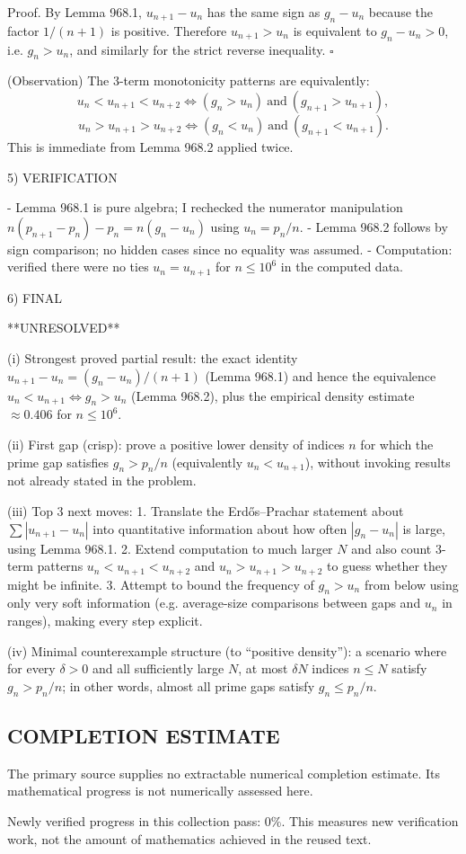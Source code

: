 Proof.
By Lemma 968.1, $u_{n+1}-u_n$ has the same sign as $g_n-u_n$ because the factor $1/(n+1)$ is positive. Therefore $u_{n+1}>u_n$ is equivalent to $g_n-u_n>0$, i.e. $g_n>u_n$, and similarly for the strict reverse inequality. $\square$

(Observation) The 3-term monotonicity patterns are equivalently:
\[
 u_n<u_{n+1}<u_{n+2}\iff (g_n>u_n)\ \text{and}\ (g_{n+1}>u_{n+1}),
\]
\[
 u_n>u_{n+1}>u_{n+2}\iff (g_n<u_n)\ \text{and}\ (g_{n+1}<u_{n+1}).
\]
This is immediate from Lemma 968.2 applied twice.

5) VERIFICATION

- Lemma 968.1 is pure algebra; I rechecked the numerator manipulation $n(p_{n+1}-p_n)-p_n = n(g_n-u_n)$ using $u_n=p_n/n$.
- Lemma 968.2 follows by sign comparison; no hidden cases since no equality was assumed.
- Computation: verified there were no ties $u_n=u_{n+1}$ for $n\le 10^6$ in the computed data.

6) FINAL

**UNRESOLVED**

(i) Strongest proved partial result: the exact identity $u_{n+1}-u_n=(g_n-u_n)/(n+1)$ (Lemma 968.1) and hence the equivalence $u_n<u_{n+1}\iff g_n>u_n$ (Lemma 968.2), plus the empirical density estimate $\approx 0.406$ for $n\le 10^6$.

(ii) First gap (crisp): prove a positive lower density of indices $n$ for which the prime gap satisfies $g_n>p_n/n$ (equivalently $u_n<u_{n+1}$), without invoking results not already stated in the problem.

(iii) Top 3 next moves:
1. Translate the Erd\H{o}s--Prachar statement about $\sum |u_{n+1}-u_n|$ into quantitative information about how often $|g_n-u_n|$ is large, using Lemma 968.1.
2. Extend computation to much larger $N$ and also count 3-term patterns $u_n<u_{n+1}<u_{n+2}$ and $u_n>u_{n+1}>u_{n+2}$ to guess whether they might be infinite.
3. Attempt to bound the frequency of $g_n>u_n$ from below using only very soft information (e.g. average-size comparisons between gaps and $u_n$ in ranges), making every step explicit.

(iv) Minimal counterexample structure (to “positive density”): a scenario where for every $\delta>0$ and all sufficiently large $N$, at most $\delta N$ indices $n\le N$ satisfy $g_n>p_n/n$; in other words, almost all prime gaps satisfy $g_n\le p_n/n$.




\subsection*{COMPLETION ESTIMATE}
The primary source supplies no extractable numerical completion estimate. Its mathematical progress is not numerically assessed here.

Newly verified progress in this collection pass: $0\%$. This measures new verification work, not the amount of mathematics achieved in the reused text.
